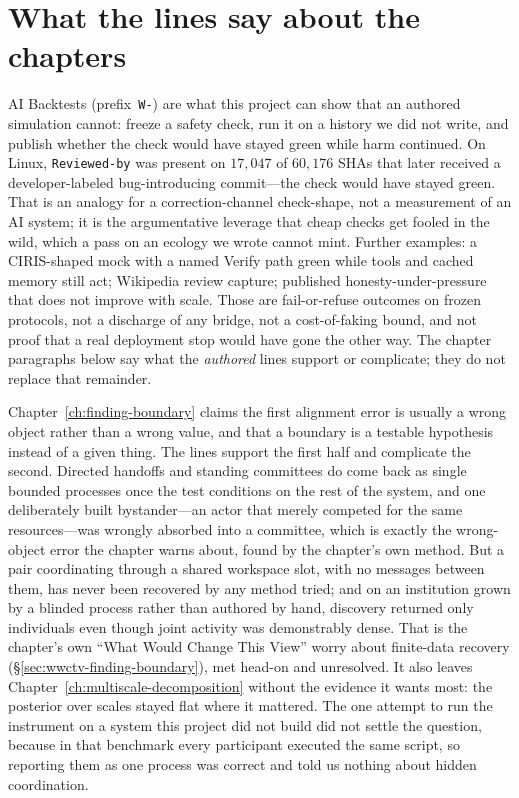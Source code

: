 \section{What the lines say about the chapters}
\label{sec:appn-chapter-synthesis}
\begin{authbar}{AI}
Backtests (prefix~\texttt{W-}) are what this project can show that an authored simulation cannot: freeze a safety check, run it on a history we did not write, and publish whether the check would have stayed green while harm continued.
On Linux, \texttt{Reviewed-by} was present on $17{,}047$ of $60{,}176$ SHAs that later received a developer-labeled bug-introducing commit---the check would have stayed green.
That is an analogy for a correction-channel check-shape, not a measurement of an AI system; it is the argumentative leverage that cheap checks get fooled in the wild, which a pass on an ecology we wrote cannot mint.
Further examples: a CIRIS-shaped mock with a named Verify path green while tools and cached memory still act; Wikipedia review capture; published honesty-under-pressure that does not improve with scale.
Those are fail-or-refuse outcomes on frozen protocols, not a discharge of any bridge, not a cost-of-faking bound, and not proof that a real deployment stop would have gone the other way.
The chapter paragraphs below say what the \emph{authored} lines support or complicate; they do not replace that remainder.

Chapter~\ref{ch:finding-boundary} claims the first alignment error is usually a wrong object rather than a wrong value, and that a boundary is a testable hypothesis instead of a given thing.
The lines support the first half and complicate the second.
Directed handoffs and standing committees do come back as single bounded processes once the test conditions on the rest of the system, and one deliberately built bystander---an actor that merely competed for the same resources---was wrongly absorbed into a committee, which is exactly the wrong-object error the chapter warns about, found by the chapter's own method.
But a pair coordinating through a shared workspace slot, with no messages between them, has never been recovered by any method tried; and on an institution grown by a blinded process rather than authored by hand, discovery returned only individuals even though joint activity was demonstrably dense.
That is the chapter's own ``What Would Change This View'' worry about finite-data recovery (\S\ref{sec:wwctv-finding-boundary}), met head-on and unresolved.
It also leaves Chapter~\ref{ch:multiscale-decomposition} without the evidence it wants most: the posterior over scales stayed flat where it mattered.
The one attempt to run the instrument on a system this project did not build did not settle the question, because in that benchmark every participant executed the same script, so reporting them as one process was correct and told us nothing about hidden coordination.


\end{authbar}
